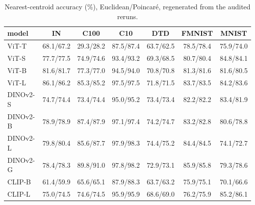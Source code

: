 \begin{table}[H]
\centering
\small
\begin{tabular}{lcccccc}
\toprule
model & IN & C100 & C10 & DTD & FMNIST & MNIST \\
\midrule
ViT-T & 68.1/67.2 & 29.3/28.2 & 87.5/87.4 & 63.7/62.5 & 78.5/78.4 & 75.9/74.0 \\
ViT-S & 77.7/77.5 & 74.9/74.6 & 93.4/93.2 & 69.3/68.5 & 80.7/80.4 & 84.8/84.1 \\
ViT-B & 81.6/81.7 & 77.3/77.0 & 94.5/94.0 & 70.8/70.8 & 81.3/81.6 & 81.6/80.5 \\
ViT-L & 86.1/86.2 & 85.3/85.2 & 97.5/97.5 & 71.8/71.5 & 83.7/83.5 & 84.2/83.6 \\
DINOv2-S & 74.7/74.4 & 73.4/74.4 & 95.0/95.2 & 73.4/73.4 & 82.2/82.2 & 83.4/81.9 \\
DINOv2-B & 78.9/78.9 & 87.4/87.9 & 97.1/97.4 & 74.2/74.7 & 83.2/82.8 & 80.6/78.8 \\
DINOv2-L & 79.8/80.4 & 85.6/87.7 & 97.9/98.3 & 74.4/75.2 & 84.4/84.5 & 74.1/72.7 \\
DINOv2-G & 78.4/78.3 & 89.8/91.0 & 97.8/98.2 & 72.9/73.1 & 85.9/85.8 & 79.3/78.6 \\
CLIP-B & 61.4/59.9 & 65.6/65.1 & 87.9/88.3 & 63.7/63.2 & 75.9/75.1 & 70.1/66.6 \\
CLIP-L & 75.0/74.5 & 74.6/74.5 & 95.9/95.9 & 68.6/69.0 & 76.2/75.9 & 85.2/86.1 \\
\bottomrule
\end{tabular}
\caption{Nearest-centroid accuracy (\%), Euclidean/Poincar\'e, regenerated from the audited reruns.}
\label{tab:a2}
\end{table}
